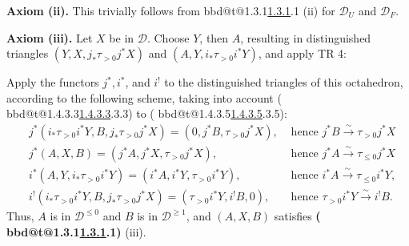 \documentclass[12pt,oneside]{amsbook}
\makeatletter
\DeclareRobustCommand{\rn}[1]{%
  \ifcsname bbd@t@#1\endcsname\hyperlink{bbd:#1}{#1}\else#1\fi}
\theoremstyle{plain}
\theoremstyle{definition}
\makeatother
\begin{document}
\textbf{Axiom (ii).} This trivially follows from \rn{1.3.1} (ii) for $\mathcal{D}_U$ and $\mathcal{D}_F$.

\textbf{Axiom (iii).} Let $X$ be in $\mathcal{D}$. Choose $Y$, then $A$, resulting in distinguished triangles $(Y, X, j_* \tau_{> 0} j^* X)$ and $(A, Y, i_* \tau_{>0} i^* Y)$, and apply TR 4:

\begin{center}
\begin{minipage}{0.45\textwidth}
\centering
{}
\end{minipage}
\end{center}

Apply the functors $j^*, i^*$, and $i^!$ to the distinguished triangles of this octahedron, according to the following scheme, taking into account {(\rn{1.4.3.3})} to {(\rn{1.4.3.5})}:
\begin{align*}
&j^* (i_* \tau_{>0} i^* Y, B, j_* \tau_{> 0} j^* X) = (0, j^* B, \tau_{> 0} j^* X),&\mbox{ hence }j^*B\overset{\sim}{\to}\tau_{>0}j^*X\\
&j^* (A, X, B) = (j^* A, j^* X, \tau_{>0} j^* X),&\mbox{ hence }j^*A\overset{\sim}{\to}\tau_{\le0}j^*X\\
&i^* (A, Y, i_* \tau_{>0} i^* Y) = (i^* A, i^* Y, \tau_{>0} i^* Y), &\mbox{ hence }i^*A\overset{\sim}{\to}\tau_{\le 0}i^*Y,\\
&i^! (i_*\tau_{>0}i^*Y,B,j_*\tau_{>0}j^*X) = (\tau_{>0}i^*Y,i^!B,0), &\mbox{ hence }\tau_{> 0}i^*Y\overset{\sim}{\to}i^!B.
\end{align*}
Thus, $A$ is in $\mathcal{D}^{\leq 0}$ and $B$ is in $\mathcal{D}^{\geq 1}$, and $(A, X, B)$ satisfies \textbf{(\rn{1.3.1})} (iii).
\end{document}

